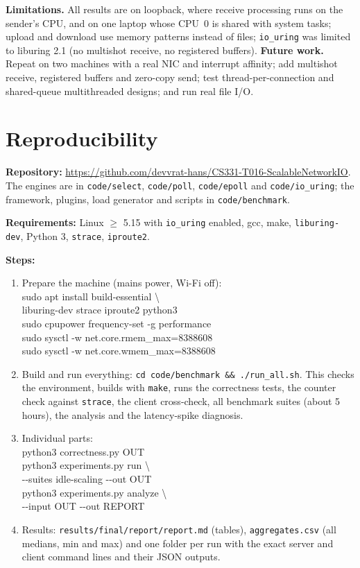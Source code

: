 \documentclass[conference,10pt]{IEEEtran}
\newcommand{\code}[1]{\texttt{#1}}
\begin{document}
\textbf{Limitations.} All results are on loopback, where receive processing runs on the sender's CPU, and on one laptop whose CPU~0 is shared with system tasks; upload and download use memory patterns instead of files; \code{io\_uring} was limited to liburing 2.1 (no multishot receive, no registered buffers).
\textbf{Future work.} Repeat on two machines with a real NIC and interrupt affinity; add multishot receive, registered buffers and zero-copy send; test thread-per-connection and shared-queue multithreaded designs; and run real file I/O.

\section{Reproducibility}
\textbf{Repository:} \url{https://github.com/devvrat-hans/CS331-T016-ScalableNetworkIO}. The engines are in \code{code/select}, \code{code/poll}, \code{code/epoll} and \code{code/io\_uring}; the framework, plugins, load generator and scripts in \code{code/benchmark}.

\textbf{Requirements:} Linux $\geq$ 5.15 with \code{io\_uring} enabled, gcc, make, \code{liburing-dev}, Python 3, \code{strace}, \code{iproute2}.

\textbf{Steps:}
\begin{enumerate}
\item Prepare the machine (mains power, Wi-Fi off):\\[1pt]
{\footnotesize\ttfamily sudo apt install build-essential \textbackslash\\
\hspace*{2em}liburing-dev strace iproute2 python3\\
sudo cpupower frequency-set -g performance\\
sudo sysctl -w net.core.rmem\_max=8388608\\
sudo sysctl -w net.core.wmem\_max=8388608}
\item Build and run everything: \code{cd code/benchmark \&\& ./run\_all.sh}. This checks the environment, builds with \code{make}, runs the correctness tests, the counter check against \code{strace}, the client cross-check, all benchmark suites (about 5 hours), the analysis and the latency-spike diagnosis.
\item Individual parts:\\[1pt]
{\footnotesize\ttfamily python3 correctness.py OUT\\
python3 experiments.py run \textbackslash\\
\hspace*{2em}-{}-suites idle-scaling -{}-out OUT\\
python3 experiments.py analyze \textbackslash\\
\hspace*{2em}-{}-input OUT -{}-out REPORT}
\item Results: \code{results/final/report/report.md} (tables), \code{aggregates.csv} (all medians, min and max) and one folder per run with the exact server and client command lines and their JSON outputs.
\end{enumerate}
\end{document}
